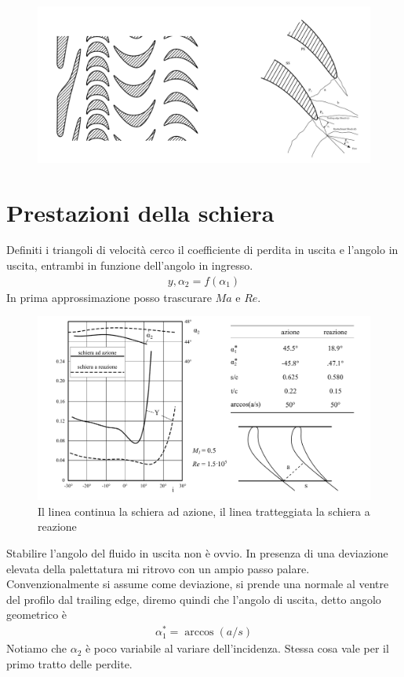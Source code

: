 \begin{figure}
\centering
  \includegraphics[width=\textwidth]{fig/PaleSup.pdf}
\caption{}
\label{fig:PaleSup}
\end{figure}

\section{Prestazioni della schiera}
Definiti i triangoli di velocità cerco il coefficiente di perdita in uscita e l'angolo in uscita, entrambi in funzione dell'angolo in ingresso.
\begin{align*}
y, \alpha_2 = f \left( \alpha_1 \right)
\end{align*}
In prima approssimazione posso trascurare $Ma$ e $Re$.
\begin{figure}
\centering
  \includegraphics[width=\textwidth]{fig/PrestSchieraTurb.pdf}
\caption{Il linea continua la schiera ad azione, il linea tratteggiata la schiera a reazione}
\label{fig:PrestSchieraTurb}
\end{figure}
Stabilire l'angolo del fluido in uscita non è ovvio. In presenza di una deviazione elevata della palettatura mi ritrovo con un ampio passo palare. Convenzionalmente si assume come deviazione, si prende una normale al ventre del profilo dal trailing edge, diremo quindi che l'angolo di uscita, detto angolo geometrico è
\begin{align*}
\alpha_1^* = \arccos (a/s)
\end{align*}
Notiamo che $\alpha_2$ è poco variabile al variare dell'incidenza. Stessa cosa vale per il primo tratto delle perdite.


